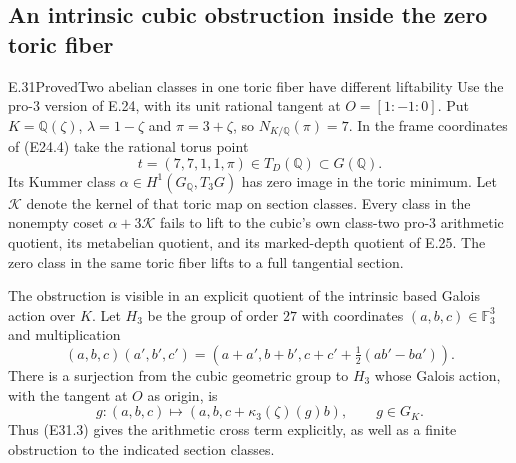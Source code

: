 \subsection{An intrinsic cubic obstruction inside the zero toric fiber}

\begin{statement}{E.31}{Proved}{Two abelian classes in one toric fiber have different liftability}
Use the pro-$3$ version of E.24, with its unit rational tangent
at $O=[1:-1:0]$. Put $K=\mathbb Q(\zeta)$,
$\lambda=1-\zeta$ and $\pi=3+\zeta$, so
$N_{K/\mathbb Q}(\pi)=7$.
In the frame coordinates of (E24.4) take the rational torus point
\[
 t=(7,7,1,1,\pi)\in T_D(\mathbb Q)\subset G(\mathbb Q).
 \tag{E31.1}
\]
Its Kummer class
$\alpha\in H^1(G_{\mathbb Q},T_3G)$ has zero image in the
toric minimum. Let $\mathcal K$ denote the kernel of that toric
map on section classes. Every class in the nonempty coset
$\alpha+3\mathcal K$ fails to lift to the cubic's own class-two
pro-$3$ arithmetic quotient, its metabelian quotient, and its
marked-depth quotient of E.25. The zero class in the same toric
fiber lifts to a full tangential section.

The obstruction is visible in an explicit quotient of the
intrinsic based Galois action over $K$.
Let $H_3$ be the group of order $27$ with coordinates
$(a,b,c)\in\mathbb F_3^3$ and multiplication
\[
 (a,b,c)(a',b',c')
 =\left(a+a',b+b',
 c+c'+\tfrac12(ab'-ba')\right).
 \tag{E31.2}
\]
There is a surjection from the cubic geometric group to $H_3$
whose Galois action, with the tangent at $O$ as origin, is
\[
 g:(a,b,c)\longmapsto
       (a,b,c+\kappa_3(\zeta)(g)b),
       \qquad g\in G_K .
 \tag{E31.3}
\]
Thus (E31.3) gives the arithmetic cross term explicitly, as
well as a finite obstruction to the indicated section classes.
\end{statement}
